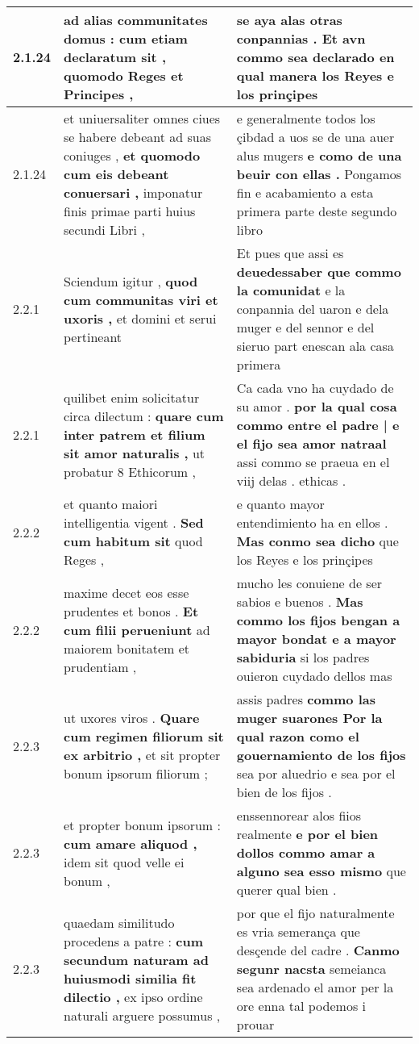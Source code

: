\begin{tabular}{|p{1cm}|p{6.5cm}|p{6.5cm}|}
2.1.24 & ad alias communitates domus : \textbf{ cum etiam declaratum sit , } quomodo Reges et Principes , & se aya alas otras conpannias . \textbf{ Et avn commo sea declarado } en qual manera los Reyes e los prinçipes \\\hline
2.1.24 & et uniuersaliter omnes ciues se habere debeant ad suas coniuges , \textbf{ et quomodo cum eis debeant conuersari , } imponatur finis primae parti huius secundi Libri , & e generalmente todos los çibdad a uos se de una auer alus mugers \textbf{ e como de una beuir con ellas . } Pongamos fin e acabamiento a esta primera parte deste segundo libro \\\hline
2.2.1 & Sciendum igitur , \textbf{ quod cum communitas viri et uxoris , } et domini et serui pertineant & Et pues que assi es \textbf{ deuedessaber que commo la comunidat } e la conpannia del uaron e dela muger e del sennor e del sieruo part enescan ala casa primera \\\hline
2.2.1 & quilibet enim solicitatur circa dilectum : \textbf{ quare cum inter patrem et filium sit amor naturalis , } ut probatur 8 Ethicorum , & Ca cada vno ha cuydado de su amor . \textbf{ por la qual cosa commo entre el padre | e el fijo sea amor natraal } assi commo se praeua en el viij delas . ethicas . \\\hline
2.2.2 & et quanto maiori intelligentia vigent . \textbf{ Sed cum habitum sit } quod Reges , & e quanto mayor entendimiento ha en ellos . \textbf{ Mas conmo sea dicho } que los Reyes e los prinçipes \\\hline
2.2.2 & maxime decet eos esse prudentes et bonos . \textbf{ Et cum filii perueniunt } ad maiorem bonitatem et prudentiam , & mucho les conuiene de ser sabios e buenos . \textbf{ Mas commo los fijos bengan a mayor bondat e a mayor sabiduria } si los padres ouieron cuydado dellos mas \\\hline
2.2.3 & ut uxores viros . \textbf{ Quare cum regimen filiorum sit ex arbitrio , } et sit propter bonum ipsorum filiorum ; & assis padres \textbf{ commo las muger suarones Por la qual razon como el gouernamiento de los fijos } sea por aluedrio e sea por el bien de los fijos . \\\hline
2.2.3 & et propter bonum ipsorum : \textbf{ cum amare aliquod , } idem sit quod velle ei bonum , & enssennorear alos fiios realmente \textbf{ e por el bien dollos commo amar a alguno sea esso mismo } que querer qual bien . \\\hline
2.2.3 & quaedam similitudo procedens a patre : \textbf{ cum secundum naturam ad huiusmodi similia fit dilectio , } ex ipso ordine naturali arguere possumus , & por que el fijo naturalmente es vria semerança que desçende del cadre . \textbf{ Canmo segunr nacsta } semeianca sea ardenado el amor per la ore enna tal podemos i prouar \\\hline

\end{tabular}
